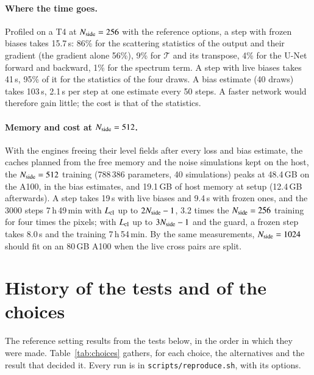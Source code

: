 \documentclass{aa}
\newcommand{\nside}{N_{\rm side}}
\begin{document}
\paragraph{Where the time goes.} Profiled on a T4 at $\nside=256$ with the reference options, a step with frozen biases takes 15.7\,s: 86\% for the scattering statistics of the output and their gradient (the gradient alone 56\%), 9\% for $\mathcal{T}$ and its transpose, 4\% for the U-Net forward and backward, 1\% for the spectrum term. A step with live biases takes 41\,s, 95\% of it for the statistics of the four draws. A bias estimate (40 draws) takes 103\,s, 2.1\,s per step at one estimate every 50 steps. A faster network would therefore gain little; the cost is that of the statistics.

\paragraph{Memory and cost at $\nside=512$.} With the engines freeing their level fields after every loss and bias estimate, the caches planned from the free memory and the noise simulations kept on the host, the $\nside=512$ training (788\,386 parameters, 40 simulations) peaks at 48.4\,GB on the A100, in the bias estimates, and 19.1\,GB of host memory at setup (12.4\,GB afterwards). A step takes 19\,s with live biases and 9.4\,s with frozen ones, and the 3000 steps 7\,h\,49\,min with $L_{\rm cl}$ up to $2\nside-1$, 3.2 times the $\nside=256$ training for four times the pixels; with $L_{\rm cl}$ up to $3\nside-1$ and the guard, a frozen step takes 8.0\,s and the training 7\,h\,54\,min. By the same measurements, $\nside=1024$ should fit on an 80\,GB A100 when the live cross pairs are split.

\section{History of the tests and of the choices}\label{sec:history}

The reference setting results from the tests below, in the order in which they were made. Table~\ref{tab:choices} gathers, for each choice, the alternatives and the result that decided it. Every run is in \texttt{scripts/reproduce.sh}, with its options.
\end{document}
